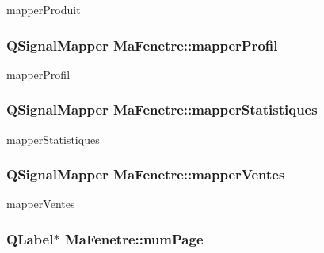 mapper\-Produit 

\hypertarget{class_ma_fenetre_a0629af8324c4d673fe70f55ead4e7b8a}{
\subsubsection[{mapper\-Profil}]{\setlength{\rightskip}{0pt plus 5cm}Q\-Signal\-Mapper Ma\-Fenetre\-::mapper\-Profil\hspace{0.3cm}{\ttfamily [protected]}}}\label{class_ma_fenetre_a0629af8324c4d673fe70f55ead4e7b8a}


mapper\-Profil 

\hypertarget{class_ma_fenetre_ad5133adcd9cb734a07b9534996224d15}{
\subsubsection[{mapper\-Statistiques}]{\setlength{\rightskip}{0pt plus 5cm}Q\-Signal\-Mapper Ma\-Fenetre\-::mapper\-Statistiques\hspace{0.3cm}{\ttfamily [protected]}}}\label{class_ma_fenetre_ad5133adcd9cb734a07b9534996224d15}


mapper\-Statistiques 

\hypertarget{class_ma_fenetre_a68f5911be4ba075ef635413eee34b623}{
\subsubsection[{mapper\-Ventes}]{\setlength{\rightskip}{0pt plus 5cm}Q\-Signal\-Mapper Ma\-Fenetre\-::mapper\-Ventes\hspace{0.3cm}{\ttfamily [protected]}}}\label{class_ma_fenetre_a68f5911be4ba075ef635413eee34b623}


mapper\-Ventes 

\hypertarget{class_ma_fenetre_a941eff753d1e20d0ef212aa875570330}{
\subsubsection[{num\-Page}]{\setlength{\rightskip}{0pt plus 5cm}Q\-Label$\ast$ Ma\-Fenetre\-::num\-Page\hspace{0.3cm}{\ttfamily [protected]}}}\label{class_ma_fenetre_a941eff753d1e20d0ef212aa875570330}



